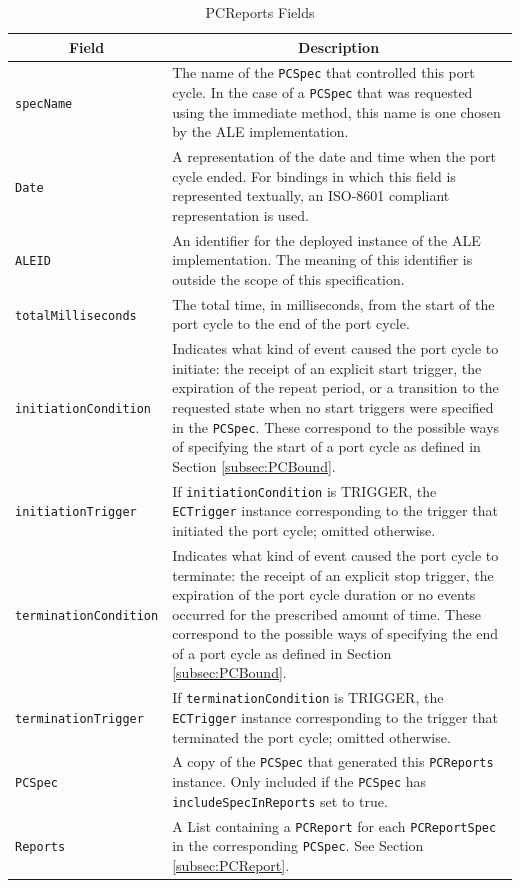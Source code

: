 \documentclass[11pt,a4paper,oneside]{article}
\begin{document}
\begin{table}[!h]
\begin{tabular}{ 
|p{}%
|p{}|%
}
\hline
\multicolumn{1}{|c|}{\textbf{Field}}
&\multicolumn{1}{c|}{\textbf{Description}}\\
\hline
\texttt{specName}&The name of the \texttt{PCSpec} that controlled this port cycle. In the case of a \texttt{PCSpec} that was requested using the immediate method, this name is one chosen by the ALE implementation.\\
\hline
\texttt{Date}&A representation of the date and time when the port cycle ended. For bindings in which this field is represented textually, an ISO-8601 compliant representation is used.\\
\hline
\texttt{ALEID}&An identifier for the deployed instance of the ALE implementation. The meaning of this identifier is outside the scope of this specification.\\
\hline
\texttt{totalMilliseconds}&The total time, in milliseconds, from the start of the port cycle to the end of the port cycle.\\
\hline
\texttt{initiationCondition}&Indicates what kind of event caused the port cycle to initiate: the receipt of an explicit start trigger, the expiration of the repeat period, or a transition to the requested state when no start triggers were specified in the \texttt{PCSpec}. These correspond to the possible ways of specifying the start of a port cycle as defined in Section \ref{subsec:PCBound}.\\
\hline
\texttt{initiationTrigger}&If \texttt{initiationCondition} is TRIGGER, the \texttt{ECTrigger} instance corresponding to the trigger that initiated the port cycle; omitted otherwise.\\
\hline
\texttt{terminationCondition}&Indicates what kind of event caused the port cycle to terminate: the receipt of an explicit stop trigger, the expiration of the port cycle duration or no events occurred for the prescribed amount of time. These correspond to the possible ways of specifying the end of a port cycle as defined in Section \ref{subsec:PCBound}.\\
\hline
\texttt{terminationTrigger}&If \texttt{terminationCondition} is TRIGGER, the \texttt{ECTrigger} instance corresponding to the trigger that terminated the port cycle; omitted otherwise.\\
\hline
\texttt{PCSpec}&A copy of the \texttt{PCSpec} that generated this \texttt{PCReports} instance. Only included if the \texttt{PCSpec} has \texttt{includeSpecInReports} set to true.\\
 \hline
\texttt{Reports}&A List containing a \texttt{PCReport} for each \texttt{PCReportSpec} in the corresponding \texttt{PCSpec}. See Section \ref{subsec:PCReport}.\\
\hline
\end{tabular}
\caption{PCReports Fields}
\MakeLineNo
\end{table}
\FloatBarrier
\end{document}
